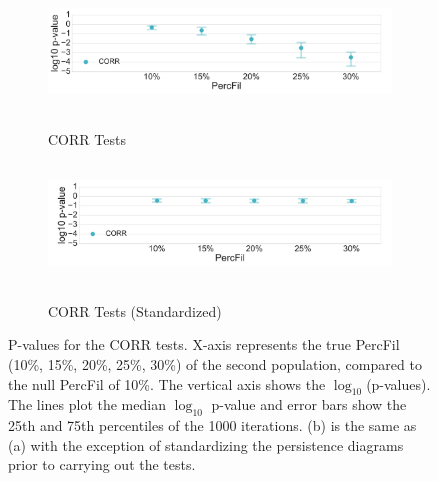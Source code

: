 \documentclass[12pt]{article}
\begin{document}
\begin{figure}[htp!]
  \centering
  \begin{subfigure}{.75\textwidth}
    \caption{CORR Tests}
    \includegraphics[height = 1.25in]{figure_8_correlation_group.pdf}
    \label{fig:sub_corr}
  \end{subfigure}
  \begin{subfigure}{.75\textwidth}
    \caption{CORR Tests (Standardized)}
    \includegraphics[height = 1.25in]{figure_8_correlation_group_normed.pdf}
    \label{fig:sub_corr_normed}
  \end{subfigure}
\caption{P-values for the CORR tests. X-axis represents the true PercFil (10\%, 15\%, 20\%, 25\%, 30\%) of the second population, compared to the null PercFil of 10\%.
The vertical axis shows the $\log_{10}$(p-values). The lines plot the median $\log_{10}$ p-value and error bars show the 25th and 75th percentiles of the 1000 iterations. (b) is the same as (a) with the exception of standardizing the persistence diagrams prior to carrying out the tests. }
\label{fig:sub_corr_results_2}
\end{figure}
\end{document}
